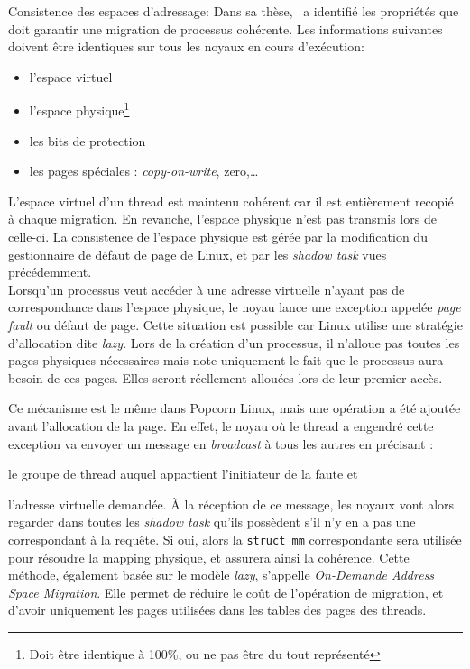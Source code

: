       \begin{paragraph}{Consistence des espaces d'adressage:}
        Dans sa thèse,~\citeauthor{katz2013popcorn} a identifié les propriétés
        que doit garantir une migration de processus cohérente. Les informations
        suivantes doivent être identiques sur tous les noyaux en cours
        d'exécution:
        \begin{itemize}
          \item l'espace virtuel
          \item l'espace physique\footnote{Doit être identique à 100\%, ou ne
            pas être du tout représenté}
          \item les bits de protection
          \item les pages spéciales : \textit{copy-on-write}, zero,\ldots\\
        \end{itemize}

        L'espace virtuel d'un thread est maintenu cohérent car il est
        entièrement recopié à chaque migration. En revanche, l'espace physique
        n'est pas transmis lors de celle-ci. La consistence de l'espace physique
        est gérée par la modification du gestionnaire de défaut de page de
        Linux, et par les \textit{shadow task} vues précédemment.\\

        Lorsqu'un processus veut accéder à une adresse virtuelle n'ayant pas de
        correspondance dans l'espace physique, le noyau lance une exception
        appelée \textit{page fault} ou défaut de page. Cette situation est
        possible car Linux utilise une stratégie d'allocation dite
        \textit{lazy}. Lors de la création d'un processus, il n'alloue pas
        toutes les pages physiques nécessaires mais note uniquement le fait que
        le processus aura besoin de ces pages. Elles seront réellement allouées
        lors de leur premier accès.

        Ce mécanisme est le même dans Popcorn Linux, mais une opération a été
        ajoutée avant l'allocation de la page. En effet, le noyau où le thread a
        engendré cette exception va envoyer un message en \textit{broadcast} à
        tous les autres en précisant :\benumline \item le groupe de thread
        auquel appartient l'initiateur de la faute et \item l'adresse virtuelle
        demandée\eenumline. À la réception de ce message, les noyaux vont alors
        regarder dans toutes les \textit{shadow task} qu'ils possèdent s'il n'y
        en a pas une correspondant à la requête. Si oui, alors la \texttt{struct
          mm} correspondante sera utilisée pour résoudre la mapping physique, et
        assurera ainsi la cohérence. Cette méthode, également basée sur le
        modèle \textit{lazy}, s'appelle \textit{On-Demande Address Space
          Migration}. Elle permet de réduire le coût de l'opération de
        migration, et d'avoir uniquement les pages utilisées dans les tables
        des pages des threads.


\end{paragraph}
